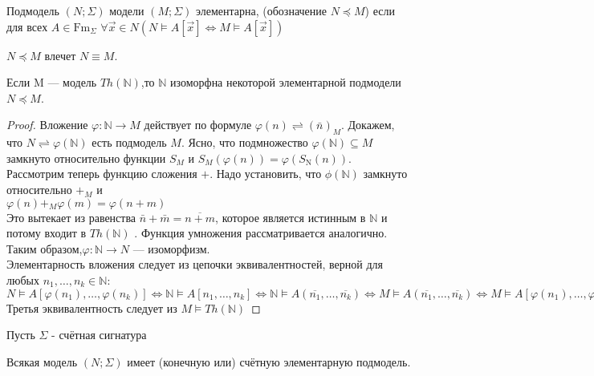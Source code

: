 \begin{definition}
	Подмодель $(N ;\Sigma)$ модели $(M ;\Sigma)$ элементарна, (обозначение $N \preccurlyeq M$) если для всех $A \in
	\mathrm{Fm}_{\Sigma}$ $\forall \vec{x} \in N(N \vDash A[\vec{x}] \Longleftrightarrow M \vDash A[\vec{x}])$
\end{definition}
\begin{proposition}
	$N \preccurlyeq M$ влечет $N \equiv M$.
\end{proposition}
\begin{example}
	Если M — модель $Th(\mathbb{N})$,то $\mathbb{N}$ изоморфна некоторой элементарной подмодели  $N \preccurlyeq M$.
\end{example}
\begin{proof}
	Вложение $\varphi: \mathbb{N} \rightarrow M$ действует по формуле $\varphi(n) \rightleftharpoons(\bar{n})_{M}$.
	Докажем, что $N \rightleftharpoons \varphi(\mathbb{N})$
	есть подмодель $M$. Ясно, что подмножество $\varphi(\mathbb{N}) \subseteq M$ замкнуто относительно функции $S_M$ и
	$S_{M}(\varphi(n))=\varphi\left(S_{\mathrm{N}}(n)\right)$. Рассмотрим теперь функцию сложения $+$. Надо
	установить, что $\phi(\mathbb{N})$ замкнуто относительно $+_M$ и 
	\\$\varphi(n)+_{M} \varphi(m)=\varphi(n+m)$\\
	Это вытекает из равенства $\bar{n}+\bar{m}=\overline{n+m}$, которое является истинным в $\mathbb{N}$
	и потому входит в $Th(\mathbb{N})$ . Функция умножения рассматривается аналогично.
	Таким образом,$\varphi: \mathbb{N} \rightarrow N$  — изоморфизм.\\
	Элементарность вложения следует из цепочки эквивалентностей, верной для любых $n_{1}, \dots, n_{k} \in
	\mathbb{N}$:\\
	$N \vDash A\left[\varphi\left(n_{1}\right), \ldots, \varphi\left(n_{k}\right)\right] \Longleftrightarrow
	\mathbb{N} \vDash A\left[n_{1}, \ldots, n_{k}\right] \Longleftrightarrow \mathbb{N} \vDash A(\overline{n_{1}},
	\ldots, \overline{n_{k}})\Longleftrightarrow M \vDash A(\overline{n_{1}}, \ldots, \overline{n_{k}})
	\Longleftrightarrow M \vDash A\left[\varphi\left(n_{1}\right), \ldots, \varphi\left(n_{k}\right)\right]$\\
	Третья эквивалентность следует из $M \vDash T h(\mathbb{N})$
\end{proof}
Пусть $\Sigma$ - счётная сигнатура\\
\begin{theorem}
	Всякая модель  $(N ;\Sigma)$ имеет (конечную или) счётную элементарную подмодель.
\end{theorem}
